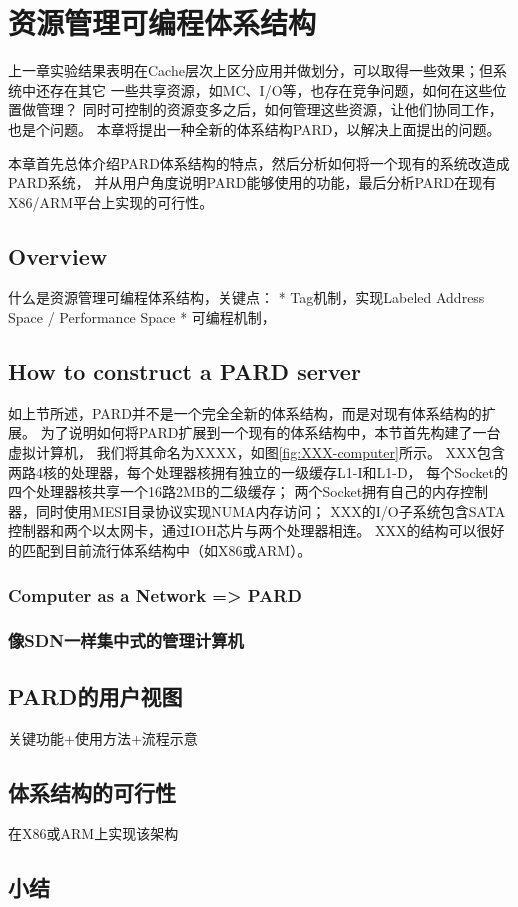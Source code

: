 

\chapter{资源管理可编程体系结构}
\label{cha:pard}

上一章实验结果表明在Cache层次上区分应用并做划分，可以取得一些效果；但系统中还存在其它
一些共享资源，如MC、I/O等，也存在竞争问题，如何在这些位置做管理？
同时可控制的资源变多之后，如何管理这些资源，让他们协同工作，也是个问题。
本章将提出一种全新的体系结构PARD，以解决上面提出的问题。

本章首先总体介绍PARD体系结构的特点，然后分析如何将一个现有的系统改造成PARD系统，
并从用户角度说明PARD能够使用的功能，最后分析PARD在现有X86/ARM平台上实现的可行性。


\section{Overview}

什么是资源管理可编程体系结构，关键点：
 * Tag机制，实现Labeled Address Space / Performance Space
 * 可编程机制，


\section{How to construct a PARD server}

如上节所述，PARD并不是一个完全全新的体系结构，而是对现有体系结构的扩展。
为了说明如何将PARD扩展到一个现有的体系结构中，本节首先构建了一台虚拟计算机，
我们将其命名为XXXX，如图\ref{fig:XXX-computer}所示。
XXX包含两路4核的处理器，每个处理器核拥有独立的一级缓存L1-I和L1-D，
每个Socket的四个处理器核共享一个16路2MB的二级缓存；
两个Socket拥有自己的内存控制器，同时使用MESI目录协议实现NUMA内存访问；
XXX的I/O子系统包含SATA控制器和两个以太网卡，通过IOH芯片与两个处理器相连。
XXX的结构可以很好的匹配到目前流行体系结构中（如X86或ARM）。

\subsection{Computer as a Network => PARD}

\subsection{像SDN一样集中式的管理计算机}


\section{PARD的用户视图}

关键功能+使用方法+流程示意


\section{体系结构的可行性}

在X86或ARM上实现该架构


\section{小结}


